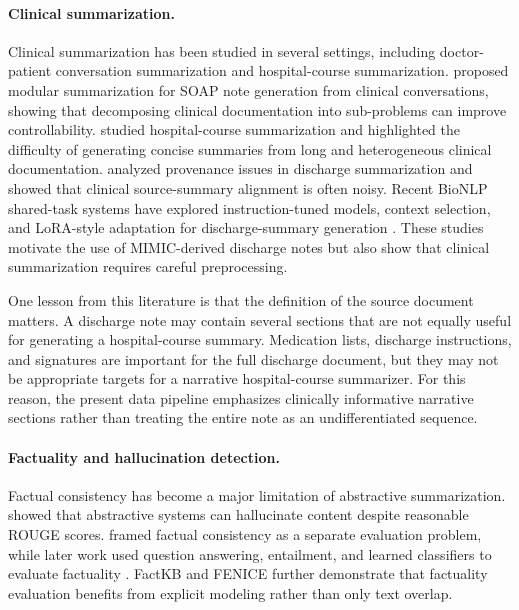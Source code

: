 \documentclass[11pt]{article}
\begin{document}
\paragraph{Clinical summarization.}
Clinical summarization has been studied in several settings, including doctor-patient conversation summarization and hospital-course summarization. \citet{krishna2021soap} proposed modular summarization for SOAP note generation from clinical conversations, showing that decomposing clinical documentation into sub-problems can improve controllability. \citet{adams2021hospitalcourse} studied hospital-course summarization and highlighted the difficulty of generating concise summaries from long and heterogeneous clinical documentation. \citet{landes2023dsprov} analyzed provenance issues in discharge summarization and showed that clinical source-summary alignment is often noisy. Recent BioNLP shared-task systems have explored instruction-tuned models, context selection, and LoRA-style adaptation for discharge-summary generation \cite{wu2024epfl, he2024shimo, liu2024csiro}. These studies motivate the use of MIMIC-derived discharge notes but also show that clinical summarization requires careful preprocessing.

One lesson from this literature is that the definition of the source document matters. A discharge note may contain several sections that are not equally useful for generating a hospital-course summary. Medication lists, discharge instructions, and signatures are important for the full discharge document, but they may not be appropriate targets for a narrative hospital-course summarizer. For this reason, the present data pipeline emphasizes clinically informative narrative sections rather than treating the entire note as an undifferentiated sequence.

\paragraph{Factuality and hallucination detection.}
Factual consistency has become a major limitation of abstractive summarization. \citet{maynez2020faithfulness} showed that abstractive systems can hallucinate content despite reasonable ROUGE scores. \citet{kryscinski2020evaluating} framed factual consistency as a separate evaluation problem, while later work used question answering, entailment, and learned classifiers to evaluate factuality \cite{wang2020asking, scialom2021questeval, goyal2021annotating, laban2022summac, fabbri2022qafacteval}. FactKB \cite{feng2023factkb} and FENICE \cite{scire2024fenice} further demonstrate that factuality evaluation benefits from explicit modeling rather than only text overlap.
\end{document}
